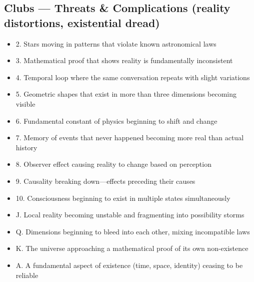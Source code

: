 \documentclass[11pt]{article}
\begin{document}
\subsection*{Clubs — Threats \& Complications (reality distortions, existential dread)}
\begin{itemize}[leftmargin=*]
\item 2. Stars moving in patterns that violate known astronomical laws
\item 3. Mathematical proof that shows reality is fundamentally inconsistent
\item 4. Temporal loop where the same conversation repeats with slight variations
\item 5. Geometric shapes that exist in more than three dimensions becoming visible
\item 6. Fundamental constant of physics beginning to shift and change
\item 7. Memory of events that never happened becoming more real than actual history
\item 8. Observer effect causing reality to change based on perception
\item 9. Causality breaking down—effects preceding their causes
\item 10. Consciousness beginning to exist in multiple states simultaneously
\item J. Local reality becoming unstable and fragmenting into possibility storms
\item Q. Dimensions beginning to bleed into each other, mixing incompatible laws
\item K. The universe approaching a mathematical proof of its own non-existence
\item A. A fundamental aspect of existence (time, space, identity) ceasing to be reliable
\end{itemize}
\end{document}
